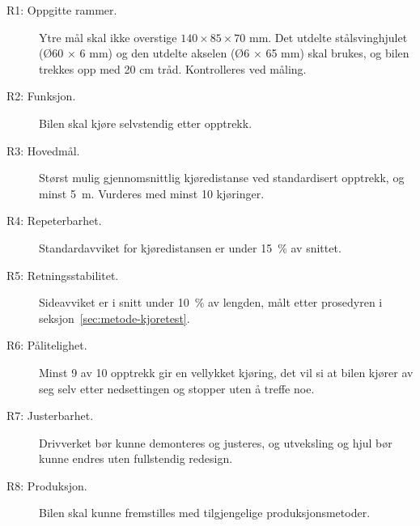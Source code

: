 \begin{description}
    \item[R1: Oppgitte rammer.] Ytre mål skal ikke overstige $140 \times 85 \times 70$ mm. Det utdelte stålsvinghjulet (Ø60 × 6 mm) og den utdelte akselen (Ø6 × 65 mm) skal brukes, og bilen trekkes opp med 20 cm tråd. Kontrolleres ved måling.
    \item[R2: Funksjon.] Bilen skal kjøre selvstendig etter opptrekk.
    \item[R3: Hovedmål.] Størst mulig gjennomsnittlig kjøredistanse ved standardisert opptrekk, og minst \SI{5}{m}. Vurderes med minst 10 kjøringer.
    \item[R4: Repeterbarhet.] Standardavviket for kjøredistansen er under \SI{15}{\percent} av snittet.
    \item[R5: Retningsstabilitet.] Sideavviket er i snitt under \SI{10}{\percent} av lengden, målt etter prosedyren i seksjon~\ref{sec:metode-kjoretest}.
    \item[R6: Pålitelighet.] Minst 9 av 10 opptrekk gir en vellykket kjøring, det vil si at bilen kjører av seg selv etter nedsettingen og stopper uten å treffe noe.
    \item[R7: Justerbarhet.] Drivverket bør kunne demonteres og justeres, og utveksling og hjul bør kunne endres uten fullstendig redesign.
    \item[R8: Produksjon.] Bilen skal kunne fremstilles med tilgjengelige produksjonsmetoder.
\end{description}


